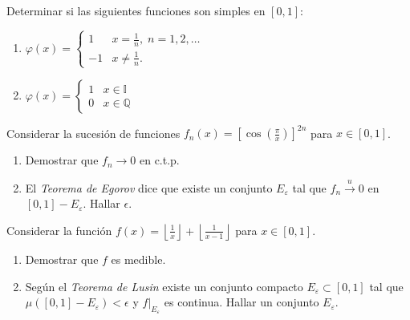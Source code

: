 \documentclass{book}
\newcommand{\qq}{\mathbb{Q}}
\newcommand{\ii}{\mathbb{I}}
\begin{document}
\begin{ejer}{} 
Determinar si las siguientes funciones son simples en $[0,1]$:
\begin{enumerate}
\item $\varphi(x)=
\left\{
\begin{array}{rl}
1& x=\frac{1}{n},\;n=1,2,\dots
\\
-1&x\neq \frac{1}{n}.
\end{array}
\right.
$
\item 
$\varphi(x)=
\left\{
\begin{array}{ll}
1& x \in \ii
\\
0&x\in \qq
\end{array}
\right.
$
\end{enumerate}
\end{ejer}




\begin{ejer}{} 
Considerar la sucesi\'on de funciones $f_n(x)=[\cos(\frac{\pi}{x})]^{2n}$ para $x \in [0,1]$.
\begin{enumerate}
\item Demostrar que $f_n \to 0$ en c.t.p.
\item El \textit{Teorema de Egorov} dice que existe un conjunto $E_{\varepsilon}$ tal que $f_n \xrightarrow{u} 0$
en $[0,1]-E_{\varepsilon}$. 
Hallar $\epsilon$.
\end{enumerate}
\end{ejer}


\begin{ejer}{}  
Considerar la funci\'on 
$f(x)=\left\lfloor \frac{1}{x}\right\rfloor+\left\lfloor \frac{1}{x-1}\right\rfloor$
para $x \in [0,1]$.
\begin{enumerate}
\item Demostrar que $f$ es medible.
\item Seg\'un el \textit{Teorema de Lusin} existe  un conjunto compacto $E_{\varepsilon}\subset [0,1]$
tal que $\mu([0,1]-E_{\varepsilon})<\epsilon$ y $f\left.\right|_{E_{\varepsilon}}$ es continua.
Hallar un conjunto $E_{\varepsilon}$.
\end{enumerate}
\end{ejer}



	
	
	
	


\end{document}
